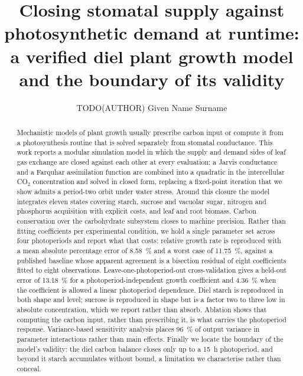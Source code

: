 \documentclass[a4paper,fleqn]{cas-sc}
\begin{document}
\let\WriteBookmarks\relax
\def\floatpagepagefraction{1}
\def\textpagefraction{.001}


\title[mode=title]{Closing stomatal supply against photosynthetic demand at
runtime: a verified diel plant growth model and the boundary of its validity}

\author[1]{TODO(AUTHOR) Given Name Surname}

\begin{abstract}
Mechanistic models of plant growth usually prescribe carbon input or compute it
from a photosynthesis routine that is solved separately from stomatal
conductance. This work reports a modular simulation model in which the supply
and demand sides of leaf gas exchange are closed against each other at every
evaluation: a Jarvis conductance and a Farquhar assimilation function are
combined into a quadratic in the intercellular CO$_2$ concentration and solved
in closed form, replacing a fixed-point iteration that we show admits a
period-two orbit under water stress. Around this closure the model integrates
eleven states covering starch, sucrose and vacuolar sugar, nitrogen and
phosphorus acquisition with explicit costs, and leaf and root biomass. Carbon
conservation over the carbohydrate subsystem closes to machine precision.
Rather than fitting coefficients per experimental condition, we hold a single
parameter set across four photoperiods and report what that costs: relative
growth rate is reproduced with a mean absolute percentage error of 8.58~\% and a
worst case of 11.75~\%, against a published baseline whose apparent agreement is
a bisection residual of eight coefficients fitted to eight observations.
Leave-one-photoperiod-out cross-validation gives a held-out error of 13.18~\%
for a photoperiod-independent growth coefficient and 4.36~\% when the
coefficient is allowed a linear photoperiod dependence. Diel starch is
reproduced in both shape and level; sucrose is reproduced in shape but is a
factor two to three low in absolute concentration, which we report rather than
absorb. Ablation shows that computing the carbon input, rather than prescribing
it, is what carries the photoperiod response. Variance-based sensitivity
analysis places 96~\% of output variance in parameter interactions rather than
main effects. Finally we locate the boundary of the model's validity: the diel
carbon balance closes only up to a 15~h photoperiod, and beyond it starch
accumulates without bound, a limitation we characterise rather than conceal.
\end{abstract}
\end{document}
